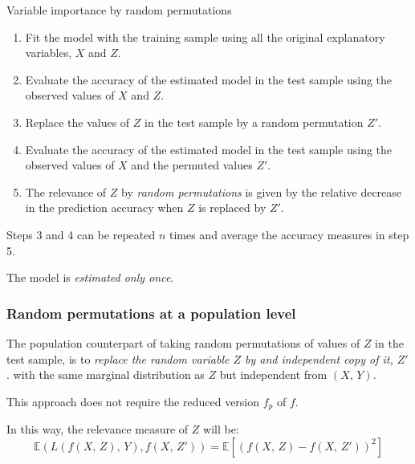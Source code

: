 \begin{algorithm}{Variable importance by random permutations}{}
	\begin{enumerate}
		\item Fit the model with the training sample using all the original
		      explanatory variables, $X$ and $Z$.
		\item Evaluate the accuracy of the estimated model in the test sample using the observed values of
		      $X$ and $Z$.
		\item Replace the values of $Z$ in the test sample by a random permutation
		      $Z'$.
		\item Evaluate the accuracy of the estimated model in the test sample using the observed values of $X$
		      and the permuted values $Z'$.
		\item The relevance of $Z$ by \emph{random permutations} is given by the relative
		      decrease in the prediction accuracy when $Z$ is replaced by $Z'$.
	\end{enumerate}
	\tcblower
	\begin{note}
		Steps 3 and 4 can be repeated $n$ times and average the accuracy measures in step 5.
	\end{note}
	\begin{note}
		The model is \emph{estimated only once}.
	\end{note}
\end{algorithm}

\subsubsection{Random permutations at a population level}

The population counterpart of taking random permutations of values
of $Z$ in the test sample, is to \emph{replace the random variable $Z$ by and independent
	copy of it, $Z'$}. with the same marginal distribution as
$Z$ but independent from $(X,\,Y)$.

This approach does not require the reduced version $f_p$ of $f$.

In this way, the relevance measure of $Z$ will be:
\begin{equation*}
	\mathds{E}(L(f(X,\,Z),\,Y),f(X,\,Z')) = \mathds{E} \left[ (f(X,\,Z) - f(X,\,Z'))^2 \right]
\end{equation*}

